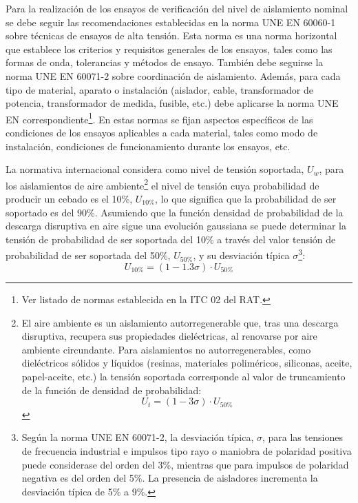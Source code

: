         Para la realización de los ensayos de verificación del nivel de aislamiento nominal se debe seguir las recomendaciones establecidas en la norma UNE EN 60060-1 sobre técnicas de ensayos de alta tensión. Esta norma es una norma horizontal que establece los criterios y requisitos generales de los ensayos, tales como las formas de onda, tolerancias y métodos de ensayo. También debe seguirse la norma UNE EN 60071-2 sobre coordinación de aislamiento. Además, para cada tipo de material, aparato o instalación (aislador, cable, transformador de potencia, transformador de medida, fusible, etc.) debe aplicarse la norma UNE EN correspondiente\footnote{Ver listado de normas establecida en la ITC 02 del RAT.}. En estas normas se fijan aspectos específicos de las condiciones de los ensayos aplicables a cada material, tales como modo de instalación, condiciones de funcionamiento durante los ensayos, etc.\newline
        
        La normativa internacional considera como nivel de tensión soportada, $U_\textit{w}$, para los aislamientos de aire ambiente\footnote{El aire ambiente es un aislamiento autorregenerable que, tras una descarga disruptiva, recupera sus propiedades dieléctricas, al renovarse por aire ambiente circundante. Para aislamientos no autorregenerables, como dieléctricos sólidos y líquidos (resinas, materiales poliméricos, siliconas, aceite, papel-aceite, etc.) la tensión soportada corresponde al valor de truncamiento de la función de densidad de probabilidad: $$U_\textit{t} = (1-3\sigma)\cdot  U_{50\!\text{\%}}$$} el nivel de tensión cuya probabilidad de producir un cebado es el 10\!\%, $U_{10\!\text{\%}}$, lo que significa que la probabilidad de ser soportado es del 90\!\%. Asumiendo que la función densidad de probabilidad de la descarga disruptiva en aire sigue una evolución gaussiana se puede determinar la tensión de probabilidad de ser soportada del 10\!\% a través del valor tensión de probabilidad de ser soportada del 50\!\%, $U_{50\!\text{\%}}$, y su desviación típica $\sigma$\footnote{Según la norma UNE EN 60071-2, la desviación típica, $\sigma$, para las tensiones de frecuencia industrial e impulsos tipo rayo o maniobra de polaridad positiva puede considerase del orden del 3\!\%, mientras que para impulsos de polaridad negativa es del orden del 5\!\%. La presencia de aisladores incrementa la desviación típica de 5\!\% a 9\!\%.}:
        \begin{equation}
            U_{10\!\text{\%}} = (1-1.3\sigma)\cdot U_{50\!\text{\%}}
        \end{equation}

